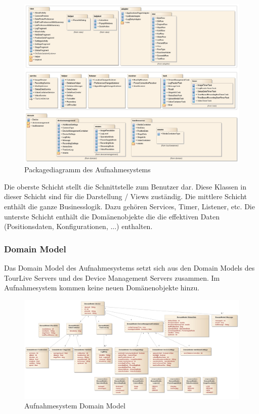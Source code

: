 \begin{figure}[H]
	\centering
	\includegraphics[width=150mm]{images/android/schichten.jpg}
	\caption{Packagediagramm des Aufnahmesystems}
\end{figure}

Die oberste Schicht stellt die Schnittstelle zum Benutzer dar. Diese Klassen in dieser Schicht sind für die Darstellung / Views zuständig. Die mittlere Schicht enthält die ganze Businesslogik. Dazu gehören Services, Timer, Listener, etc. Die unterste Schicht enthält die Domänenobjekte die die effektiven Daten (Positionsdaten, Konfigurationen, ...) enthalten. 

\subsubsection{Domain Model}
Das Domain Model des Aufnahmesystems setzt sich aus den Domain Models des TourLive Servers und des Device Management Servers zusammen. Im Aufnahmesystem kommen keine neuen Domänenobjekte hinzu.

\begin{figure}[H]
\centering
\includegraphics[width=150mm]{images/android/domainmodel.jpg}
\caption{Aufnahmesystem Domain Model}
\end{figure}

